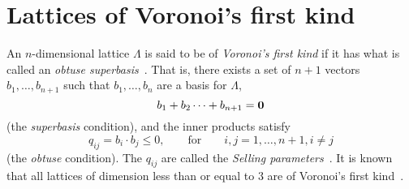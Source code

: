 \documentclass[final,leqno]{siamltex}
\begin{document}
\section{Lattices of Voronoi's first kind} \label{sec:latt-voron-first}

An $n$-dimensional lattice $\Lambda$ is said to be of \emph{Voronoi's first kind} if it has what is called an \emph{obtuse superbasis}~\cite{ConwaySloane1992_voronoi_lattice_3d_obtuse_superbases}.  That is, there exists a set of $n+1$ vectors $b_1,\dots,b_{n+1}$ such that $b_1,\dots,b_n$ are a basis for $\Lambda$,
\begin{equation}\label{eq:superbasecond}
b_1 + b_2 \dots + b_{n+1} = \zerobf
\end{equation}
(the \emph{superbasis} condition), and the inner products satisfy
\begin{equation}\label{eq:obtusecond}
q_{ij} = b_i \cdot b_j \leq 0, \qquad \text{for} \qquad i,j = 1,\dots,n+1, i \neq j
\end{equation}
(the \emph{obtuse} condition).  The $q_{ij}$ are called the \emph{Selling parameters}~\cite{Selling1874}.  It is known that all lattices of dimension less than or equal to $3$ are of Voronoi's first kind~\cite{ConwaySloane1992_voronoi_lattice_3d_obtuse_superbases}.  
\end{document}
